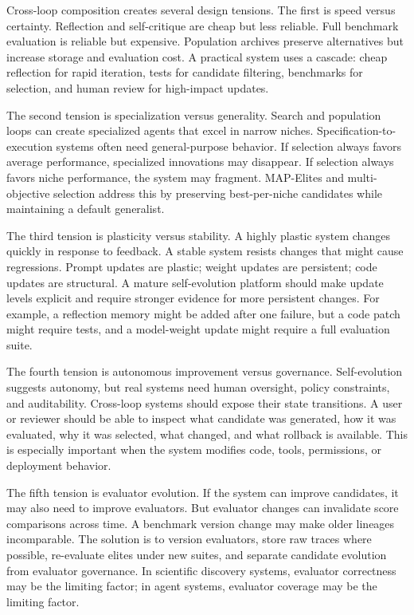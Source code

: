 Cross-loop composition creates several design tensions.  The first is speed versus certainty.  Reflection and self-critique are cheap but less reliable.  Full benchmark evaluation is reliable but expensive.  Population archives preserve alternatives but increase storage and evaluation cost.  A practical system uses a cascade: cheap reflection for rapid iteration, tests for candidate filtering, benchmarks for selection, and human review for high-impact updates.

The second tension is specialization versus generality.  Search and population loops can create specialized agents that excel in narrow niches.  Specification-to-execution systems often need general-purpose behavior.  If selection always favors average performance, specialized innovations may disappear.  If selection always favors niche performance, the system may fragment.  MAP-Elites and multi-objective selection address this by preserving best-per-niche candidates while maintaining a default generalist.

The third tension is plasticity versus stability.  A highly plastic system changes quickly in response to feedback.  A stable system resists changes that might cause regressions.  Prompt updates are plastic; weight updates are persistent; code updates are structural.  A mature self-evolution platform should make update levels explicit and require stronger evidence for more persistent changes.  For example, a reflection memory might be added after one failure, but a code patch might require tests, and a model-weight update might require a full evaluation suite.

The fourth tension is autonomous improvement versus governance.  Self-evolution suggests autonomy, but real systems need human oversight, policy constraints, and auditability.  Cross-loop systems should expose their state transitions.  A user or reviewer should be able to inspect what candidate was generated, how it was evaluated, why it was selected, what changed, and what rollback is available.  This is especially important when the system modifies code, tools, permissions, or deployment behavior.

The fifth tension is evaluator evolution.  If the system can improve candidates, it may also need to improve evaluators.  But evaluator changes can invalidate score comparisons across time.  A benchmark version change may make older lineages incomparable.  The solution is to version evaluators, store raw traces where possible, re-evaluate elites under new suites, and separate candidate evolution from evaluator governance.  In scientific discovery systems, evaluator correctness may be the limiting factor; in agent systems, evaluator coverage may be the limiting factor.

